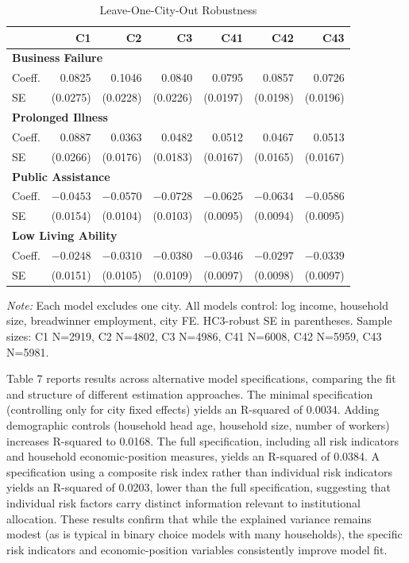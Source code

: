 \documentclass[12pt,a4paper]{article}
\begin{document}
\begin{table}[!h]
\centering
\small
\caption{Leave-One-City-Out Robustness}
\label{tab:loco}
\begin{tabular}{lrrrrrr}
\toprule
 & C1 & C2 & C3 & C41 & C42 & C43 \\
\midrule
\multicolumn{7}{l}{\textbf{Business Failure}} \\
Coeff. & 0.0825 & 0.1046 & 0.0840 & 0.0795 & 0.0857 & 0.0726 \\
SE & (0.0275) & (0.0228) & (0.0226) & (0.0197) & (0.0198) & (0.0196) \\
\midrule
\multicolumn{7}{l}{\textbf{Prolonged Illness}} \\
Coeff. & 0.0887 & 0.0363 & 0.0482 & 0.0512 & 0.0467 & 0.0513 \\
SE & (0.0266) & (0.0176) & (0.0183) & (0.0167) & (0.0165) & (0.0167) \\
\midrule
\multicolumn{7}{l}{\textbf{Public Assistance}} \\
Coeff. & $-0.0453$ & $-0.0570$ & $-0.0728$ & $-0.0625$ & $-0.0634$ & $-0.0586$ \\
SE & (0.0154) & (0.0104) & (0.0103) & (0.0095) & (0.0094) & (0.0095) \\
\midrule
\multicolumn{7}{l}{\textbf{Low Living Ability}} \\
Coeff. & $-0.0248$ & $-0.0310$ & $-0.0380$ & $-0.0346$ & $-0.0297$ & $-0.0339$ \\
SE & (0.0151) & (0.0105) & (0.0109) & (0.0097) & (0.0098) & (0.0097) \\
\bottomrule
\end{tabular}

\noindent\small\emph{Note:} Each model excludes one city. All models control: log income, household size, breadwinner employment, city FE. HC3-robust SE in parentheses. Sample sizes: C1 N=2919, C2 N=4802, C3 N=4986, C41 N=6008, C42 N=5959, C43 N=5981.
\end{table}

Table 7 reports results across alternative model specifications, comparing the fit and structure of different estimation approaches. The minimal specification (controlling only for city fixed effects) yields an R-squared of 0.0034. Adding demographic controls (household head age, household size, number of workers) increases R-squared to 0.0168. The full specification, including all risk indicators and household economic-position measures, yields an R-squared of 0.0384. A specification using a composite risk index rather than individual risk indicators yields an R-squared of 0.0203, lower than the full specification, suggesting that individual risk factors carry distinct information relevant to institutional allocation. These results confirm that while the explained variance remains modest (as is typical in binary choice models with many households), the specific risk indicators and economic-position variables consistently improve model fit.
\end{document}
